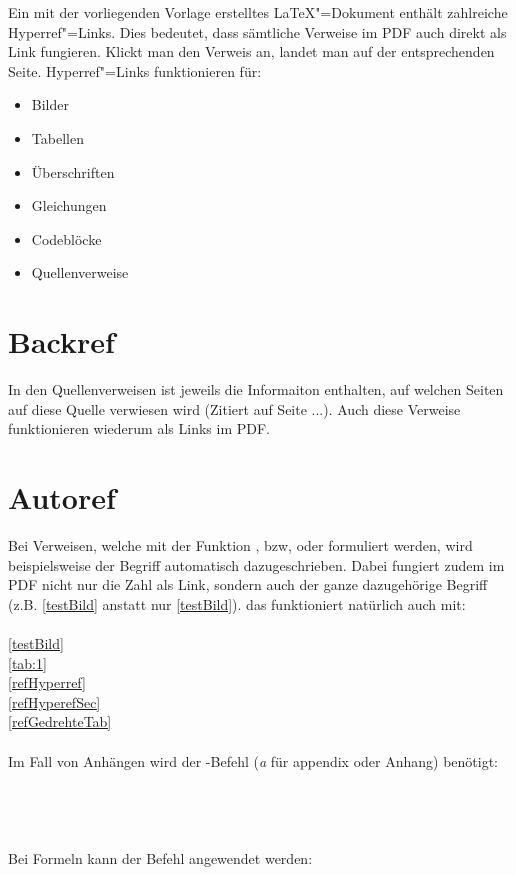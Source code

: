 %
Ein mit der vorliegenden Vorlage erstelltes \LaTeX "=Dokument enthält zahlreiche Hyperref"=Links. Dies bedeutet, dass sämtliche Verweise im PDF auch direkt als Link fungieren. Klickt man den Verweis an, landet man auf der entsprechenden Seite. Hyperref"=Links funktionieren für:%
%
\begin{itemize}%
\item Bilder%
\item Tabellen%
\item Überschriften%
\item Gleichungen%
\item Codeblöcke%
\item Quellenverweise%
\end{itemize}%
%
\section{Backref} \label{refHyperefSec}%
%
In den Quellenverweisen ist jeweils die Informaiton enthalten, auf welchen Seiten auf diese Quelle verwiesen wird (Zitiert auf Seite ...). Auch diese Verweise funktionieren wiederum als Links im PDF.%
%
\section{Autoref}%
%
Bei Verweisen, welche mit der Funktion , bzw,  oder  formuliert werden, wird beispielsweise der Begriff  automatisch dazugeschrieben. Dabei fungiert zudem im PDF nicht nur die Zahl als Link, sondern auch der ganze dazugehörige Begriff (z.B. \autoref{testBild} anstatt nur \ref{testBild}).%
%
das funktioniert natürlich auch mit:\\ \\%
\autoref{testBild}\\%
\autoref{tab:1}\\%
\autoref{refHyperref}\\%
\autoref{refHyperefSec}\\%
\autoref{refGedrehteTab}\\ \\%
%
Im Fall von Anhängen wird der -Befehl (\textit{a} für appendix oder Anhang) benötigt:\\ \\%
%
\\%
\\ \\%
%
Bei Formeln kann der Befehl  angewendet werden: \\ \\%
%
 \hspace{10mm}%
%
